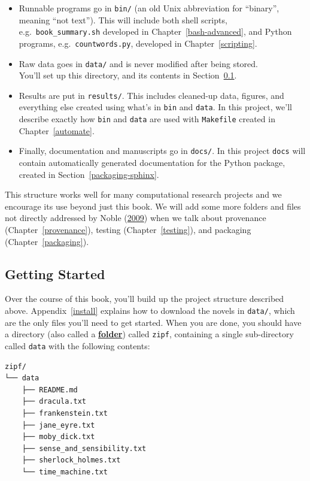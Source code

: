 \documentclass[
]{krantz}
\newcommand{\gref}[2]{\hyperlink{#2}{\textbf{#1}}}
\begin{document}
\begin{itemize}
\item
  Runnable programs go in \texttt{bin/}
  (an old Unix abbreviation for ``binary'', meaning ``not text'').
  This will include both shell scripts,
  e.g.~\texttt{book\_summary.sh} developed in Chapter~\ref{bash-advanced},
  and Python programs,
  e.g.~\texttt{countwords.py}, developed in Chapter~\ref{scripting}.
\item
  Raw data goes in \texttt{data/}
  and is never modified after being stored.\\
  You'll set up this directory,
  and its contents in Section~\ref{intro-setup}.
\item
  Results are put in \texttt{results/}.
  This includes cleaned-up data,
  figures,
  and everything else created using what's in \texttt{bin} and \texttt{data}.
  In this project,
  we'll describe exactly how \texttt{bin} and \texttt{data} are used
  with \texttt{Makefile} created in Chapter~\ref{automate}.
\item
  Finally,
  documentation and manuscripts go in \texttt{docs/}.
  In this project \texttt{docs} will contain automatically generated
  documentation for the Python package, created in
  Section~\ref{packaging-sphinx}.
\end{itemize}

This structure works well for many computational research projects and
we encourage its use beyond just this book.
We will add some more folders and files not directly addressed by Noble (\protect\hyperlink{ref-Nobl2009}{2009})
when we talk about provenance (Chapter~\ref{provenance}),
testing (Chapter~\ref{testing}),
and packaging (Chapter~\ref{packaging}).

\hypertarget{intro-setup}{%
\subsection{Getting Started}\label{intro-setup}}

Over the course of this book,
you'll build up the project structure described above.
Appendix~\ref{install} explains
how to download the novels in \texttt{data/},
which are the only files you'll need to get started.
When you are done,
you should have a directory (also called a \gref{folder}{folder})
called \texttt{zipf},
containing a single sub-directory called \texttt{data}
with the following contents:

\begin{verbatim}
zipf/
└── data
    ├── README.md
    ├── dracula.txt
    ├── frankenstein.txt
    ├── jane_eyre.txt
    ├── moby_dick.txt
    ├── sense_and_sensibility.txt
    ├── sherlock_holmes.txt
    └── time_machine.txt
\end{verbatim}
\end{document}
